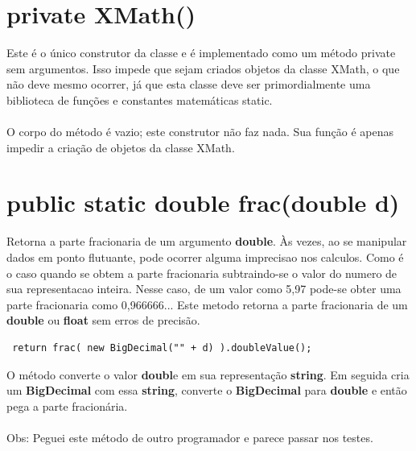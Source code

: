 \documentclass[a4paper,12pt,openany]{book}
\begin{document}
\newpage


\section*{private XMath()}

Este é o único construtor da classe e é implementado como um método private sem
argumentos. Isso impede que sejam criados objetos da classe XMath, o que não deve mesmo ocorrer, já que esta classe deve ser primordialmente uma biblioteca de funções e constantes matemáticas static.
\\
\\
O corpo do método é vazio; este construtor não faz nada. Sua função é apenas impedir a criação de objetos da classe XMath.


\section*{public static double frac(double d)}

Retorna a parte fracionaria de um argumento \textbf{double}. Às vezes, ao se 
manipular dados em ponto flutuante, pode ocorrer alguma imprecisao nos
calculos. Como é o caso quando se obtem a parte fracionaria subtraindo-se
o valor do numero de sua representacao inteira. Nesse caso,  de um valor
como 5,97 pode-se obter uma parte fracionaria como 0,966666... Este 
metodo retorna a parte fracionaria de um \textbf{double} ou \textbf{float} sem erros de 
precisão.

\begin{lstlisting}
 return frac( new BigDecimal("" + d) ).doubleValue();
\end{lstlisting}

O método converte o valor \textbf{doubl}e em sua representação \textbf{string}. Em seguida cria um
\textbf{BigDecimal} com essa \textbf{string}, converte o \textbf{BigDecimal} para \textbf{double} e então pega a parte fracionária.
\\
\\
Obs: Peguei este método de outro programador e parece passar nos testes.  
\end{document}
